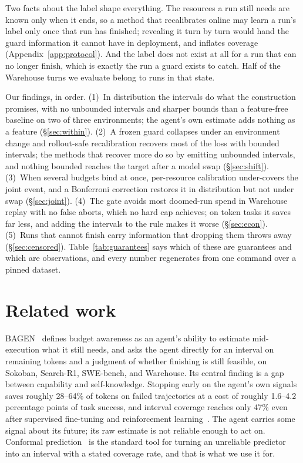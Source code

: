 \documentclass{article}
\begin{document}
Two facts about the label shape everything. The resources a run still needs are known only when it ends, so a method that recalibrates online may learn a run's label only once that run has finished; revealing it turn by turn would hand the guard information it cannot have in deployment, and inflates coverage (Appendix~\ref{app:protocol}). And the label does not exist at all for a run that can no longer finish, which is exactly the run a guard exists to catch. Half of the Warehouse turns we evaluate belong to runs in that state.

Our findings, in order. (1)~In distribution the intervals do what the construction promises, with no unbounded intervals and sharper bounds than a feature-free baseline on two of three environments; the agent's own estimate adds nothing as a feature (\S\ref{sec:within}). (2)~A frozen guard collapses under an environment change and rollout-safe recalibration recovers most of the loss with bounded intervals; the methods that recover more do so by emitting unbounded intervals, and nothing bounded reaches the target after a model swap (\S\ref{sec:shift}). (3)~When several budgets bind at once, per-resource calibration under-covers the joint event, and a Bonferroni correction restores it in distribution but not under swap (\S\ref{sec:joint}). (4)~The gate avoids most doomed-run spend in Warehouse replay with no false aborts, which no hard cap achieves; on token tasks it saves far less, and adding the intervals to the rule makes it worse (\S\ref{sec:econ}). (5)~Runs that cannot finish carry information that dropping them throws away (\S\ref{sec:censored}). Table~\ref{tab:guarantees} says which of these are guarantees and which are observations, and every number regenerates from one command over a pinned dataset.

\section{Related work}
\label{sec:related}

BAGEN~\cite{lin2026bagen} defines budget awareness as an agent's ability to estimate mid-execution what it still needs, and asks the agent directly for an interval on remaining tokens and a judgment of whether finishing is still feasible, on Sokoban, Search-R1, SWE-bench, and Warehouse. Its central finding is a gap between capability and self-knowledge. Stopping early on the agent's own signals saves roughly 28--64\% of tokens on failed trajectories at a cost of roughly 1.6--4.2 percentage points of task success, and interval coverage reaches only 47\% even after supervised fine-tuning and reinforcement learning~\cite{lin2026bagen}. The agent carries some signal about its future; its raw estimate is not reliable enough to act on. Conformal prediction~\cite{angelopoulos2023gentle,lei2018distribution} is the standard tool for turning an unreliable predictor into an interval with a stated coverage rate, and that is what we use it for.
\end{document}
